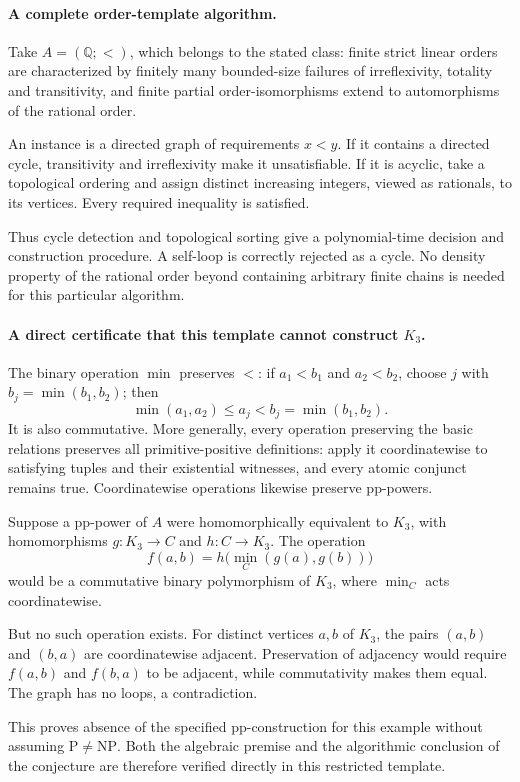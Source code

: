 \documentclass[11pt]{article}
\begin{document}
\paragraph{A complete order-template algorithm.}
Take $A=(\mathbb Q;<)$, which belongs to the stated class: finite strict linear orders are characterized by finitely many bounded-size failures of irreflexivity, totality and transitivity, and finite partial order-isomorphisms extend to automorphisms of the rational order.

An instance is a directed graph of requirements $x<y$. If it contains a directed cycle, transitivity and irreflexivity make it unsatisfiable. If it is acyclic, take a topological ordering and assign distinct increasing integers, viewed as rationals, to its vertices. Every required inequality is satisfied.

Thus cycle detection and topological sorting give a polynomial-time decision and construction procedure. A self-loop is correctly rejected as a cycle. No density property of the rational order beyond containing arbitrary finite chains is needed for this particular algorithm.

\paragraph{A direct certificate that this template cannot construct $K_3$.}
The binary operation $\min$ preserves $<$: if $a_1<b_1$ and $a_2<b_2$, choose $j$ with $b_j=\min(b_1,b_2)$; then
\[
 \min(a_1,a_2)\le a_j<b_j=\min(b_1,b_2).
\]
It is also commutative. More generally, every operation preserving the basic relations preserves all primitive-positive definitions: apply it coordinatewise to satisfying tuples and their existential witnesses, and every atomic conjunct remains true. Coordinatewise operations likewise preserve pp-powers.

Suppose a pp-power of $A$ were homomorphically equivalent to $K_3$, with homomorphisms $g:K_3\to C$ and $h:C\to K_3$. The operation
\[
 f(a,b)=h\bigl(\min_C(g(a),g(b))\bigr)
\]
would be a commutative binary polymorphism of $K_3$, where $\min_C$ acts coordinatewise.

But no such operation exists. For distinct vertices $a,b$ of $K_3$, the pairs $(a,b)$ and $(b,a)$ are coordinatewise adjacent. Preservation of adjacency would require $f(a,b)$ and $f(b,a)$ to be adjacent, while commutativity makes them equal. The graph has no loops, a contradiction.

This proves absence of the specified pp-construction for this example without assuming $\mathrm P\ne\mathrm{NP}$. Both the algebraic premise and the algorithmic conclusion of the conjecture are therefore verified directly in this restricted template.
\end{document}
